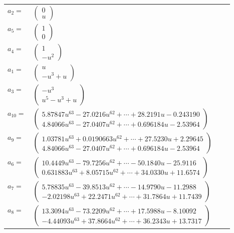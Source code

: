 \documentclass[1p]{elsarticle_modified}
\theoremstyle{definition}
\begin{document}
\begin{tabular}{m{7pt} m{180pt} m{7pt} m{180pt} }
\flushright $a_{2}=$&$\begin{pmatrix}0\\u\end{pmatrix}$ \\
\flushright $a_{5}=$&$\begin{pmatrix}1\\0\end{pmatrix}$ \\
\flushright $a_{4}=$&$\begin{pmatrix}1\\- u^2\end{pmatrix}$ \\
\flushright $a_{1}=$&$\begin{pmatrix}u\\- u^3+u\end{pmatrix}$ \\
\flushright $a_{3}=$&$\begin{pmatrix}- u^3\\u^5- u^3+u\end{pmatrix}$ \\
\flushright $a_{10}=$&$\begin{pmatrix}5.87847 u^{63}-27.0216 u^{62}+\cdots+28.2191 u-0.243190\\4.84066 u^{63}-27.0407 u^{62}+\cdots+0.696184 u-2.53964\end{pmatrix}$ \\
\flushright $a_{9}=$&$\begin{pmatrix}1.03781 u^{63}+0.0190663 u^{62}+\cdots+27.5230 u+2.29645\\4.84066 u^{63}-27.0407 u^{62}+\cdots+0.696184 u-2.53964\end{pmatrix}$ \\
\flushright $a_{6}=$&$\begin{pmatrix}10.4449 u^{63}-79.7256 u^{62}+\cdots-50.1840 u-25.9116\\0.631883 u^{63}+8.05715 u^{62}+\cdots+34.0330 u+11.6574\end{pmatrix}$ \\
\flushright $a_{7}=$&$\begin{pmatrix}5.78835 u^{63}-39.8513 u^{62}+\cdots-14.9790 u-11.2988\\-2.02198 u^{63}+22.2471 u^{62}+\cdots+31.7864 u+11.7439\end{pmatrix}$ \\
\flushright $a_{8}=$&$\begin{pmatrix}13.3094 u^{63}-73.2209 u^{62}+\cdots+17.5988 u-8.10092\\-4.44093 u^{63}+37.8664 u^{62}+\cdots+36.2343 u+13.7317\end{pmatrix}$ \\

\end{tabular}
\end{document}
